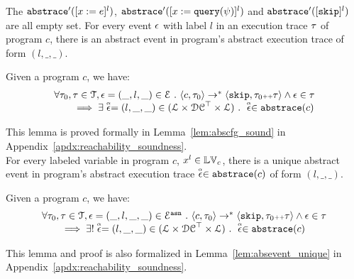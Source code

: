    The $\mathtt{abs}{\mathtt{trace}}'([x := e]^{l})$, $\mathtt{abs}{\mathtt{trace}}'([x := {\tt query}(\psi)]^{l})$ and $\mathtt{abs}{\mathtt{trace}}'([\mathtt{skip}]^{l})$ are all empty set. 
   For every event $\mathtt{\epsilon}$ with label $l$ in an execution trace $\mathtt{\tau}$ of program $c$, 
   there is an abstract event in program's abstract execution trace of form $(l, \_, \_)$. 
   \begin{lem}
     \label{lem:abscfg_sound}
   Given a program ${c}$, we have:
   \[
     \begin{array}{l}
       \forall \mathtt{\tau}_0, \mathtt{\tau} \in \mathcal{T} ,  \mathtt{\epsilon} = (\_, l, \_) \in \mathcal{E} ~.~
   \langle {c}, \mathtt{\tau}_0 \rangle \to^{*} \langle \mathtt{skip}, \mathtt{\tau}_0 {\scriptscriptstyle ++} \mathtt{\tau} \rangle 
   \land \mathtt{\epsilon} \in \mathtt{\tau} 
   \\
   \qquad \implies \exists \stackrel{\scriptscriptstyle{\alpha}}{\mathtt{\epsilon}{}} = (l, \_, \_) \in (\mathcal{L}\times \mathcal{DC}^{\top} \times \mathcal{L}) ~.~ 
   \stackrel{\scriptscriptstyle{\alpha}}{\mathtt{\epsilon}{}} \in \mathtt{abs}{\mathtt{trace}}(c)
   \end{array}
   \]
   \end{lem}
This lemma is proved formally in Lemma~\ref{lem:abscfg_sound} in Appendix~\ref{apdx:reachability_soundness}.
\\
For every labeled variable in program $c$, $x^l \in \mathbb{LV}_c$, there is a unique abstract event in program's abstract execution trace $\stackrel{\scriptscriptstyle{\alpha}}{\mathtt{\epsilon}{}} \in \mathtt{abs}{\mathtt{trace}}(c)$ of form $(l, \_, \_)$. 
\begin{lem}
  \label{lem:abscfg_unique}
Given a program ${c}$, we have:
%
\[
  \begin{array}{l}
    \forall \mathtt{\tau}_0, \mathtt{\tau} \in \mathcal{T} ,  \mathtt{\epsilon} = (\_, l, \_, \_) \in \mathcal{E}^{\mathtt{{asn}}} ~.~
\langle {c}, \mathtt{\tau}_0 \rangle \to^{*} \langle \mathtt{skip}, \mathtt{\tau}_0 {\scriptscriptstyle ++} \mathtt{\tau} \rangle 
\land \mathtt{\epsilon} \in \mathtt{\tau} 
\\
\qquad \implies \exists! \stackrel{\scriptscriptstyle{\alpha}}{\mathtt{\epsilon}{}} = (l, \_, \_) \in (\mathcal{L}\times \mathcal{DC}^{\top} \times \mathcal{L}) ~.~ 
\stackrel{\scriptscriptstyle{\alpha}}{\mathtt{\epsilon}{}} \in \mathtt{abs}{\mathtt{trace}}(c)
\end{array}
\]
\end{lem}
This lemma and proof is also 
formalized in Lemma~\ref{lem:absevent_unique} in Appendix~\ref{apdx:reachability_soundness}.

%
